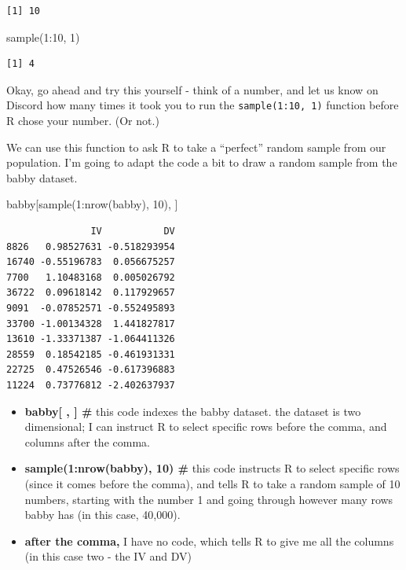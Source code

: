 \documentclass[
  letterpaper,
  DIV=11,
  numbers=noendperiod,
  oneside]{scrreprt}
\newenvironment{Shaded}{\begin{snugshade}}{\end{snugshade}}
\newcommand{\DecValTok}[1]{\textcolor[rgb]{0.68,0.00,0.00}{#1}}
\newcommand{\FunctionTok}[1]{\textcolor[rgb]{0.28,0.35,0.67}{#1}}
\newcommand{\NormalTok}[1]{\textcolor[rgb]{0.00,0.23,0.31}{#1}}
\newcommand{\SpecialCharTok}[1]{\textcolor[rgb]{0.37,0.37,0.37}{#1}}
\begin{document}
\begin{verbatim}
[1] 10
\end{verbatim}

\begin{Shaded}
\begin{Highlighting}[]
\FunctionTok{sample}\NormalTok{(}\DecValTok{1}\SpecialCharTok{:}\DecValTok{10}\NormalTok{, }\DecValTok{1}\NormalTok{)}
\end{Highlighting}
\end{Shaded}

\begin{verbatim}
[1] 4
\end{verbatim}

Okay, go ahead and try this yourself - think of a number, and let us
know on Discord how many times it took you to run the
\texttt{sample(1:10,\ 1)} function before R chose your number. (Or not.)

We can use this function to ask R to take a ``perfect'' random sample
from our population. I'm going to adapt the code a bit to draw a random
sample from the babby dataset.

\begin{Shaded}
\begin{Highlighting}[]
\NormalTok{babby[}\FunctionTok{sample}\NormalTok{(}\DecValTok{1}\SpecialCharTok{:}\FunctionTok{nrow}\NormalTok{(babby), }\DecValTok{10}\NormalTok{), ]}
\end{Highlighting}
\end{Shaded}

\begin{verbatim}
               IV           DV
8826   0.98527631 -0.518293954
16740 -0.55196783  0.056675257
7700   1.10483168  0.005026792
36722  0.09618142  0.117929657
9091  -0.07852571 -0.552495893
33700 -1.00134328  1.441827817
13610 -1.33371387 -1.064411326
28559  0.18542185 -0.461931331
22725  0.47526546 -0.617396883
11224  0.73776812 -2.402637937
\end{verbatim}

\begin{itemize}
\item
  \textbf{babby{[} , {]} \#} this code indexes the babby dataset. the
  dataset is two dimensional; I can instruct R to select specific rows
  before the comma, and columns after the comma.
\item
  \textbf{sample(1:nrow(babby), 10) \#} this code instructs R to select
  specific rows (since it comes before the comma), and tells R to take a
  random sample of 10 numbers, starting with the number 1 and going
  through however many rows babby has (in this case, 40,000).~~
\item
  \textbf{after the comma,} I have no code, which tells R to give me all
  the columns (in this case two - the IV and DV)
\end{itemize}
\end{document}
